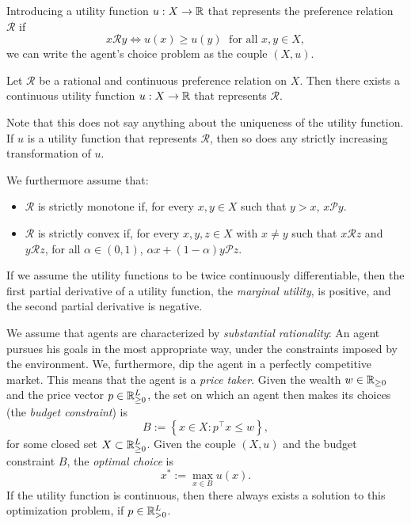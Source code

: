\documentclass[twoside, titlepage]{article}
\begin{document}
Introducing a utility function $u : X \to \mathbb{R}$ that represents the preference relation $\mathcal{R}$ if 
\[
    x \mathcal{R} y \iff u(x) \geq u(y) \; \text{ for all } x, y \in X,
\]
we can write the agent's choice problem as the couple $(X, u)$. 

\begin{theorem}
    Let $\mathcal{R}$ be a rational and continuous preference relation on $X$. Then there exists a continuous utility function $u : X \to \mathbb{R}$ that represents $\mathcal{R}$.
\end{theorem}
Note that this does not say anything about the uniqueness of the utility function. If $u$ is a utility function that represents $\mathcal{R}$, then so does any strictly increasing transformation of $u$.

\begin{assumption}
    We furthermore assume that:
    \begin{itemize}
        \item $\mathcal{R}$ is strictly monotone if, for every $x, y \in X$ such that $y > x$, $x \mathcal{P} y$.
        \item $\mathcal{R}$ is strictly convex if, for every $x, y, z \in X$ with $x \not = y$ such that $x \mathcal{R} z$ and $y \mathcal{R} z$, for all $\alpha \in (0, 1)$, $\alpha x + (1 - \alpha) y \mathcal{P} z$.
    \end{itemize}
\end{assumption}
If we assume the utility functions to be twice continuously differentiable, then the first partial derivative of a utility function, the \textit{marginal utility}, is positive, and the second partial derivative is negative.

We assume that agents are characterized by \textit{substantial rationality}: An agent pursues his goals in the most appropriate way, under the constraints imposed by the environment. We, furthermore, dip the agent in a perfectly competitive market. This means that the agent is a \textit{price taker}. Given the wealth $w \in \mathbb{R}_{\geq0}$ and the price vector $p \in \mathbb{R}_{\geq 0}^L$, the set on which an agent then makes its choices (the \textit{budget constraint}) is
\[
B := \left\{x \in X : p^\top x \leq w\right\},
\]
for some closed set $X \subset \mathbb{R}_{\geq0}^L$. Given the couple $(X, u)$ and the budget constraint $B$, the \textit{optimal choice} is
\[
    x^* := \max_{x \in B} u(x).
\]
If the utility function is continuous, then there always exists a solution to this optimization problem, if $p \in \mathbb{R}_{>0}^L$.
\end{document}
